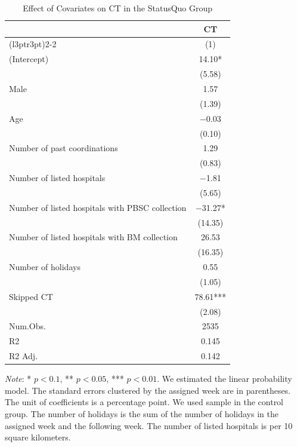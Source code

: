 \documentclass[12pt, a4paper]{article}
\begin{document}
\begin{table}[H]
\centering\centering
\caption{\label{tab:covariates-effect}Effect of Covariates on CT in the StatusQuo Group}
\centering
\fontsize{8}{10}\selectfont
\begin{threeparttable}
\begin{tabular}[t]{lc}
\toprule
\multicolumn{1}{c}{ } & \multicolumn{1}{c}{CT} \\
\cmidrule(l{3pt}r{3pt}){2-2}
  & (1)\\
\midrule
(Intercept) & \num{14.10}*\\
 & (\num{5.58})\\
Male & \num{1.57}\\
 & (\num{1.39})\\
Age & \num{-0.03}\\
 & (\num{0.10})\\
Number of past coordinations & \num{1.29}\\
 & (\num{0.83})\\
Number of listed hospitals & \num{-1.81}\\
 & (\num{5.65})\\
Number of listed hospitals with PBSC collection & \num{-31.27}*\\
 & (\num{14.35})\\
Number of listed hospitals with BM collection & \num{26.53}\\
 & (\num{16.35})\\
Number of holidays & \num{0.55}\\
 & (\num{1.05})\\
Skipped CT & \num{78.61}***\\
 & (\num{2.08})\\
\midrule
Num.Obs. & \num{2535}\\
R2 & \num{0.145}\\
R2 Adj. & \num{0.142}\\
\bottomrule
\end{tabular}
\begin{tablenotes}
\item \emph{Note}: * $p < 0.1$, ** $p < 0.05$, *** $p < 0.01$. We estimated the linear probability model. The standard errors clustered by the assigned week are in parentheses. The unit of coefficients is a percentage point. We used sample in the control group. The number of holidays is the sum of the number of holidays in the assigned week and the following week. The number of listed hospitals is per 10 square kilometers.
\end{tablenotes}
\end{threeparttable}
\end{table}
\end{document}
